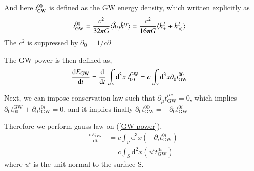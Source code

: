 \documentclass[a4paper, 12pt]{article}
\begin{document}
    And here \( t^{00}_{\textnormal{GW}}  \) is defined as the GW energy
    density, which written explicitly as 
    \begin{align}
      \label{GW energy density}
      t_{\mathrm{GW}}^{00} &= \frac{c^2}{32 \pi G} \langle \hat{h}_{ij}
      \hat{h}^{ij} \rangle = \frac{c^2}{16\pi G} \langle
      \dot{h}_{+}^{2} + \dot{h}_{\cross}^{2} \rangle
    \end{align}
The \( c^2 \) is suppressed by \(  \partial_{0}^{} = 1/c \partial_{}^{} \)


The GW power is then defined as, 
\begin{align}
  \label{GW power}
  \frac{\mathrm{d}E_{\mathrm{GW}}}{\mathrm{d}t} &=
  \frac{\mathrm{d}}{\mathrm{d}t} \int_{\nu} \mathrm{d}^{3}x \hspace{0.1cm}
  t_{00}^{\mathrm{GW}} = c \int_{\nu} \mathrm{d}^{3}x 
  \partial_{0}^{} t_{\mathrm{GW}}^{00} 
\end{align}

Next, we can impose conservation law such that \(
\partial_{\mu}^{} t_{\mathrm{GW}}^{\mu \nu} = 0 \), which implies \(
\partial_{0}^{} t_{00}^{\mathrm{GW}} + \partial_{0}^{}
t_{\mathrm{GW}}^{0i} = 0 \), and it implies finally \( \partial_{0}^{}
t_{\mathrm{GW}}^{00} = - \partial_{0}^{} t_{\mathrm{GW}}^{0i}\)

Therefore we perform gauss law on (\ref{GW power}), 
\begin{align}
  \label{gauss law on GW power}
  \frac{\mathrm{d} E_{\mathrm{GW}}}{\mathrm{d}t} &= c \int_{\nu}
  \mathrm{d}^{3}x ( - \partial_{i}^{} t_{\mathrm{GW}}^{0i} ) \\ 
  &= c \int_{S} \mathrm{d}^{2}x (u^i t_{\mathrm{GW}}^{0i})
\end{align}
where \( u^i \) is the unit normal to the surface S.
\end{document}
